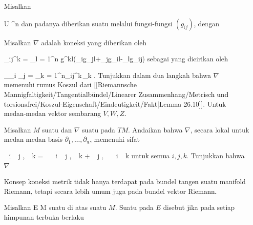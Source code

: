 {}
{

Misalkan

\mavergleichskette
{\vergleichskette
{ U
}
{ \subseteq }{ \R^n
}
{  }{
}
{    }{
}
{   }{
}
}
{}{}{}
dan padanya diberikan suatu
melalui fungsi-fungsi $\left(  g_{ij}  \right)$, dengan

 Misalkan $\nabla$ adalah koneksi yang diberikan oleh

\mavergleichskettedisp
{\vergleichskette
{ \Gamma_{ij}^k
}
{ =} { {  } \sum_{l = 1}^n g^{kl}(\partial_ig_{jl}+\partial_jg_{il}-\partial_lg_{ij})
}
{ } {
}
{ } {
}
{ } {
}
}
{}{}{}
sebagai
yang dicirikan oleh

\mavergleichskettedisp
{\vergleichskette
{ \nabla_{\partial_i } \partial_j
}
{ =} { \sum_{k = 1}^n\Gamma_{ij}^k\,\partial_k
}
{ } {
}
{ } {
}
{ } {
}
}
{}{}{.}
Tunjukkan dalam dua langkah bahwa $\nabla$ memenuhi rumus Koszul dari
[[Riemannsche Mannigfaltigkeit/Tangentialbündel/Linearer Zusammenhang/Metrisch und torsionsfrei/Koszul-Eigenschaft/Eindeutigkeit/Fakt|Lemma 26.10]].
 {Untuk medan-medan vektor sembarang $V,W,Z$.
}

}
{} {}

{}
{

Misalkan $M$ suatu
dan $\nabla$ suatu
pada $TM$. Andaikan bahwa $\nabla$, secara lokal untuk medan-medan basis $\partial_1  , \ldots , \partial_n$, memenuhi sifat

\mavergleichskettedisp
{\vergleichskette
{ \partial_i \left\langle  \partial_j  ,  \partial_k   \right\rangle
}
{ =} { \left\langle \nabla_{\partial_i } \partial_j   ,  \partial_k   \right\rangle  + \left\langle  \partial_j  ,  \nabla_{\partial_i } \partial_k    \right\rangle
}
{ } {
}
{ } {
}
{ } {
}
}
{}{}{}
untuk semua $i,j,k$. Tunjukkan bahwa $\nabla$

}
{} {}

Konsep koneksi metrik tidak hanya terdapat pada bundel tangen suatu manifold Riemann, tetapi secara lebih umum juga pada bundel vektor Riemann.

Misalkan
 { E } { M
} {}
suatu
di atas suatu
$M$. Suatu
pada $E$ disebut
jika pada setiap himpunan terbuka berlaku

